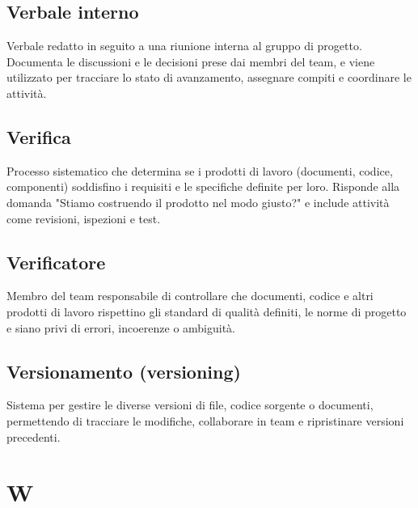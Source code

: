 \documentclass[a4paper,11pt]{article}
\begin{document}
\subsection{Verbale interno}
Verbale redatto in seguito a una riunione interna al gruppo di progetto. Documenta le discussioni e le decisioni prese dai membri del team, e viene utilizzato per tracciare lo stato di avanzamento, assegnare compiti e coordinare le attività.









\subsection{Verifica}
Processo sistematico che determina se i prodotti di lavoro (documenti, codice, componenti) soddisfino i requisiti e le specifiche definite per loro. Risponde alla domanda "Stiamo costruendo il prodotto nel modo giusto?" e include attività come revisioni, ispezioni e test.







\subsection{Verificatore}
Membro del team responsabile di controllare che documenti, codice e altri prodotti di lavoro rispettino gli standard di qualità definiti, le norme di progetto e siano privi di errori, incoerenze o ambiguità.









\subsection{Versionamento (versioning)}
Sistema per gestire le diverse versioni di file, codice sorgente o documenti, permettendo di tracciare le modifiche, collaborare in team e ripristinare versioni precedenti.

\newpage









\section{W}
\end{document}
